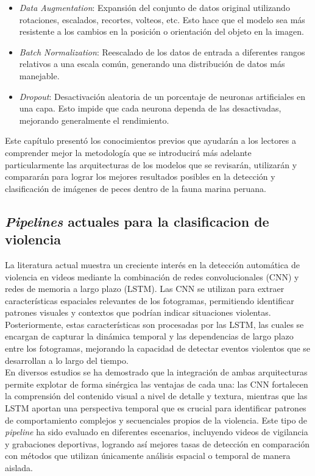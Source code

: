 \begin{itemize}
    \item {\textit{Data Augmentation}: Expansión del conjunto 
    de datos original utilizando rotaciones, escalados, recortes, 
    volteos, etc. Esto hace que el modelo sea más resistente 
    a los cambios en la posición o orientación del objeto en la imagen.}
    \item {\textit{Batch Normalization}: Reescalado de los datos 
    de entrada a diferentes rangos relativos a una escala común, 
    generando una distribución de datos más manejable.}
    \item {\textit{Dropout}: Desactivación aleatoria de un 
    porcentaje de neuronas artificiales en una capa. Esto 
    impide que cada neurona dependa de las desactivadas, 
    mejorando generalmente el rendimiento.}
\end{itemize}

Este capítulo presentó los conocimientos previos que 
ayudarán a los lectores a comprender mejor la metodología 
que se introducirá más adelante particularmente las arquitecturas de 
los modelos que se revisarán, utilizarán y compararán para 
lograr los mejores resultados posibles en la detección y clasificación 
de imágenes de peces dentro de la fauna marina peruana.



\subsection{\textit{Pipelines} actuales para la clasificacion de violencia}

La literatura actual muestra un creciente interés en la 
detección automática de violencia en videos mediante la 
combinación de redes convolucionales (CNN) y redes de 
memoria a largo plazo (LSTM). Las CNN se utilizan para extraer 
características espaciales relevantes de los fotogramas, 
permitiendo identificar patrones visuales y contextos que podrían 
indicar situaciones violentas. Posteriormente, estas 
características son procesadas por las LSTM, las cuales se 
encargan de capturar la dinámica temporal y las dependencias 
de largo plazo entre los fotogramas, mejorando la capacidad 
de detectar eventos violentos que se desarrollan a lo largo 
del tiempo.\\

En diversos estudios se ha demostrado que la integración 
de ambas arquitecturas permite explotar de forma sinérgica 
las ventajas de cada una: las CNN fortalecen la comprensión 
del contenido visual a nivel de detalle y textura, mientras 
que las LSTM aportan una perspectiva temporal que es crucial 
para identificar patrones de comportamiento complejos y 
secuenciales propios de la violencia. Este tipo de 
\textit{pipeline} ha sido evaluado en diferentes escenarios, 
incluyendo videos de vigilancia y grabaciones deportivas, 
logrando así mejores tasas de detección en comparación con 
métodos que utilizan únicamente análisis espacial o temporal 
de manera aislada.\\

